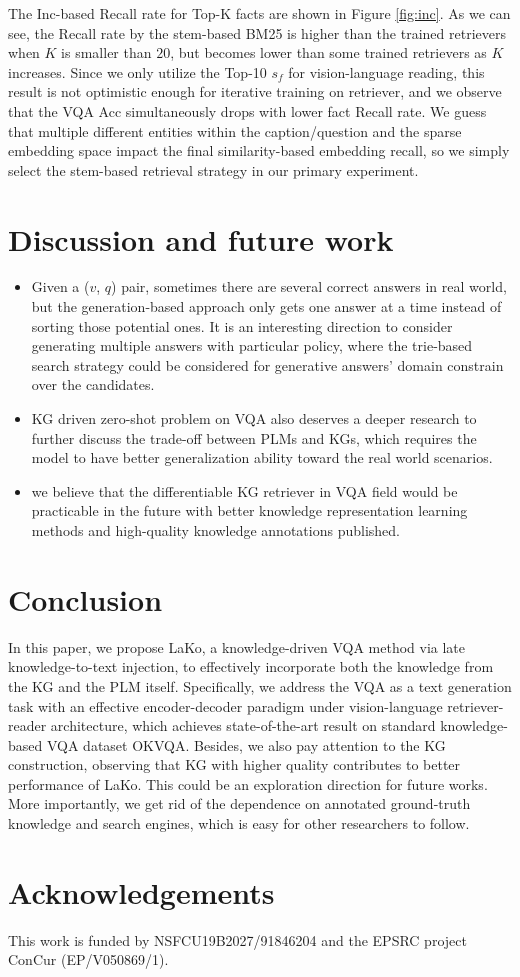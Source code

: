 \documentclass[sigconf]{acmart}
\newcommand{\cjy}[1]{{\color{black}#1}}
\begin{document}
The Inc-based Recall rate for Top-K fact\cjy{s} are shown in Figure \ref{fig:inc}.
As we can see, the Recall rate
\cjy{by the stem-based BM25 is higher than the trained retriever\cjy{s} when $K$ is smaller than $20$, but becomes lower than some trained retrievers as $K$ increases.}
Since we only utilize the Top-10 $s_f$ for vision-language reading,  this result is not optimistic enough for iterative training on retriever, and we observe that the VQA Acc simultaneously drops with lower fact Recall rate.
We guess that multiple different entities within the caption/question and the sparse embedding space impact the  final similarity-based embedding recall, so we simply select the stem-based retrieval strategy in our primary experiment.

\section{Discussion and future work}
\begin{itemize}
	\item Given a ($v$, $q$) pair, sometimes there are several correct answers in real world, but the  generation-based approach only gets one answer at a time instead of sorting those potential ones. It is  an interesting direction to consider generating multiple answers with particular policy, where the trie-based search \cite{cormen2022introduction} strategy could be considered for generative answers' domain constrain over the candidates.
	\item KG driven zero-shot problem \cite{DBLP:conf/ijcai/ChenG0HPC21,DBLP:journals/corr/abs-2112-10006,DBLP:journals/corr/abs-2106-15047,DBLP:conf/www/GengC0PYYJC21} on VQA also deserves a deeper research to further discuss the trade-off between PLMs and KGs, which requires the model to have better generalization ability toward the real world scenarios.
	\item we believe that the differentiable KG retriever in VQA field would be practicable in the future with  better knowledge representation learning methods and high-quality knowledge annotations published. 
\end{itemize}
 
\section{Conclusion}
In this paper, we propose LaKo,
a knowledge-driven VQA method via late knowledge-to-text injection, to effectively incorporate both the knowledge from the KG and the PLM itself.
Specifically, we address the VQA as a text generation task with an effective encoder-decoder paradigm under vision-language retriever-reader architecture, which achieves state-of-the-art result on standard knowledge-based VQA dataset OKVQA.
Besides, we also pay attention to the KG construction, observing that KG with higher quality contributes to better performance of LaKo. This could be an exploration direction for future  works.
More importantly, we get rid of the dependence on annotated ground-truth knowledge and search engines, which is easy for other researchers to follow.


\section{Acknowledgements}
This work is funded by NSFCU19B2027/91846204 and the EPSRC project ConCur (EP/V050869/1).



\end{document}
